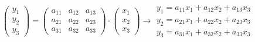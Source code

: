\begin{equation*}
\begin{pmatrix}
y_1\\
y_2\\
y_3
\end{pmatrix}=\begin{pmatrix}
a_{11}& a_{12}& a_{13}\\
a_{21}& a_{22}& a_{23}\\
a_{31}& a_{32}& a_{33}
\end{pmatrix} \cdot
\begin{pmatrix}
x_1\\
x_2\\
x_3
\end{pmatrix} \rightarrow \begin{matrix}
y_1=a_{11}x_1+a_{12}x_2+a_{13}x_3\\
y_2=a_{21}x_1+a_{22}x_2 +a_{23}x_3\\
y_3=a_{31}x_1+a_{32}x_2+a_{33}x_3
\end{matrix} 
\end{equation*}

